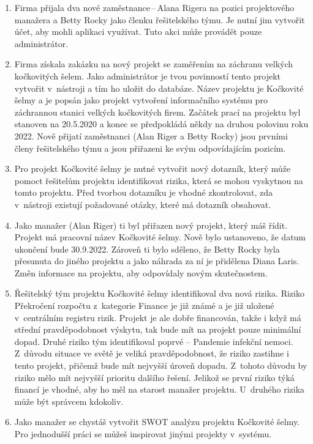 \begin{enumerate}
    \item Firma přijala dva nové zaměstnance\,--\,Alana Rigera na pozici projektového manažera a Betty Rocky jako členku řešitelského týmu. Je nutní jim vytvořit účet, aby mohli aplikaci využívat. Tuto akci může provádět pouze administrátor.
    \item Firma získala zakázku na nový projekt se zaměřením na záchranu velkých kočkovitých šelem. Jako administrátor je tvou povinností tento projekt vytvořit v~nástroji a tím ho uložit do databáze. Název projektu je Kočkovité šelmy a je popsán jako projekt vytvoření informačního systému pro záchrannou stanici velkých kočkovitých firem. Začátek prací na projektu byl stanoven na 20.5.2020 a konec se předpokládá někdy na druhou polovinu roku 2022. Nově přijatí zaměstnanci (Alan Riger a Betty Rocky) jsou prvními členy řešitelského týmu a jsou přiřazeni ke svým odpovídajícím pozicím.
    \item Pro projekt Kočkovité šelmy je nutné vytvořit nový dotazník, který může pomoct řešitelům projektu identifikovat rizika, která se mohou vyskytnou na tomto projektu. Před tvorbou dotazníku je vhodné zkontrolovat, zda v~nástroji existují požadované otázky, které má dotazník obsahovat.
    \item Jako manažer (Alan Riger) ti byl přiřazen nový projekt, který máš řídit. Projekt má pracovní název Kočkovité šelmy. Nově bylo ustanoveno, že datum ukončení bude 30.9.2022. Zároveň ti bylo sděleno, že Betty Rocky byla přesunuta do jiného projektu a jako náhrada za ní je přidělena Diana Laris. Změn informace na projektu, aby odpovídaly novým skutečnostem.
    \item Řešitelský tým projektu Kočkovité šelmy identifikoval dva nová rizika. Riziko Překročení rozpočtu z~kategorie Finance je již známé a je již uložené v~centrálním registru rizik. Projekt je ale dobře financován, takže i když má střední pravděpodobnost výskytu, tak bude mít na projekt pouze minimální dopad. Druhé riziko tým identifikoval poprvé – Pandemie infekční nemoci. Z~důvodu situace ve světě je veliká pravděpodobnost, že riziko zastihne i tento projekt, přičemž bude mít nejvyšší úroveň dopadu. Z~tohoto důvodu by riziko mělo mít nejvyšší prioritu dalšího řešení. Jelikož se první riziko týká financí je vhodné, aby ho měl na starost manažer projektu. U~druhého rizika může být správcem kdokoliv.
    \item Jako manažer se chystáš vytvořit SWOT analýzu projektu Kočkovité šelmy. Pro jednodušší práci se můžeš inspirovat jinými projekty v~systému.

\end{enumerate}
